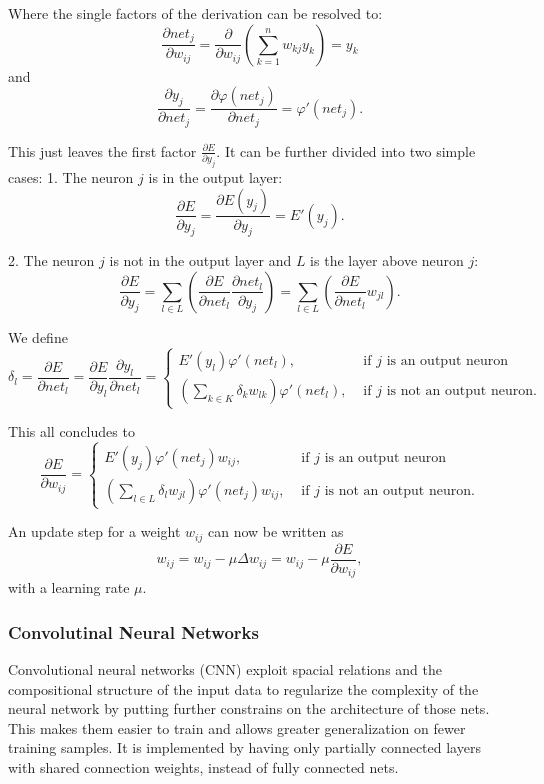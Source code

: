 Where the single factors of the derivation can be resolved to:
\[
	\frac{\partial net_j}{\partial w_{ij}} = \frac{\partial}{\partial w_{ij}} ( \sum_{k=1}^n w_{kj} y_k ) = y_k
\]
and 
\[
	\frac{\partial y_j}{\partial net_j} =  \frac{\partial \varphi(net_j)}{\partial net_j} = \varphi'(net_j).
\]


This just leaves the first factor $\frac{\partial E}{\partial y_j}$. It can be further divided into two simple cases:
1. The neuron $j$ is in the output layer:
\[
\frac{\partial E}{\partial y_j} = \frac{\partial E(y_j)}{\partial y_j} = E'(y_j).
\] 

2. The neuron $j$ is not in the output layer and $L$ is the layer above neuron $j$:
\[
\frac{\partial E}{\partial y_j} = \sum_{l \in L}( \frac{\partial E}{\partial net_l} \frac{\partial net_l}{\partial y_j} )  = \sum_{l \in L}( \frac{\partial E}{\partial net_l} w_{jl} ).
\] 

We define 
\[
\delta_l = \frac{\partial E}{\partial net_l} = \frac{\partial E}{\partial y_l} \frac{\partial y_l}{\partial net_l} =
\begin{cases}
E'(y_l) \varphi'(net_l), & \text{  if } j \text{ is an output neuron} \\
(\sum_{k \in K} \delta_k w_{lk}) \varphi'(net_l), & \text{  if } j \text{ is not an output neuron.}
\end{cases}
\]

This all concludes to 
\[
\frac{\partial E}{\partial w_{ij}} = 
\begin{cases}
E'(y_j) \varphi'(net_j) w_{ij}, & \text{  if } j \text{ is an output neuron} \\
(\sum_{l \in L} \delta_l w_{jl}) \varphi'(net_j) w_{ij}, & \text{  if } j \text{ is not an output neuron.}
\end{cases}
\]

An update step for a weight $w_{ij}$ can now be written as
\[
w_{ij} = w_{ij} - \mu \Delta w_{ij} = w_{ij} - \mu \frac{\partial E}{\partial w_{ij}},
\]
with a learning rate $\mu$.

\subsubsection{Convolutinal Neural Networks}

Convolutional neural networks (CNN) exploit spacial relations and the compositional structure of the input data to regularize the complexity of the neural network by putting further constrains on the architecture of those nets.
This makes them easier to train and allows greater generalization on fewer training samples.
It is implemented by having only partially connected layers with shared connection weights, instead of fully connected nets.    

